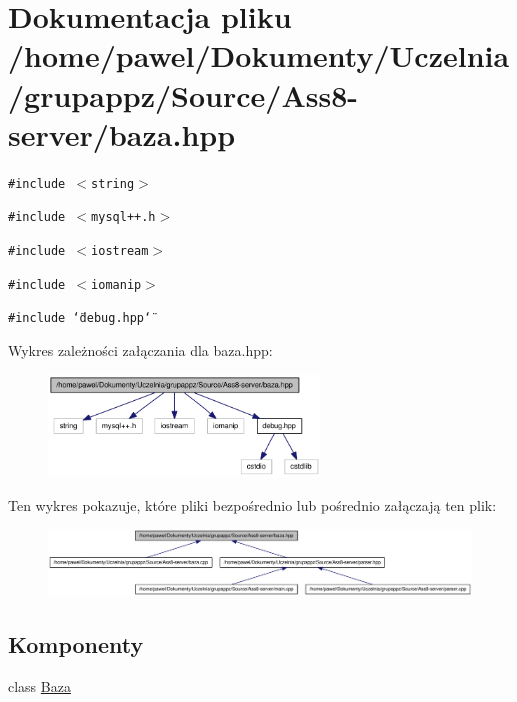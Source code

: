 \hypertarget{a00004}{
\section{Dokumentacja pliku /home/pawel/Dokumenty/Uczelnia/grupappz/Source/Ass8-server/baza.hpp}
\label{a00004}
}
{\tt \#include $<$string$>$}\par
{\tt \#include $<$mysql++.h$>$}\par
{\tt \#include $<$iostream$>$}\par
{\tt \#include $<$iomanip$>$}\par
{\tt \#include \char`\"{}debug.hpp\char`\"{}}\par


Wykres zależności załączania dla baza.hpp:\nopagebreak
\begin{figure}[H]
\begin{center}
\leavevmode
\includegraphics[width=204pt]{a00023}
\end{center}
\end{figure}


Ten wykres pokazuje, które pliki bezpośrednio lub pośrednio załączają ten plik:\nopagebreak
\begin{figure}[H]
\begin{center}
\leavevmode
\includegraphics[width=420pt]{a00024}
\end{center}
\end{figure}
\subsection*{Komponenty}
\begin{CompactItemize}
\item 
class \hyperlink{a00001}{Baza}
\end{CompactItemize}
